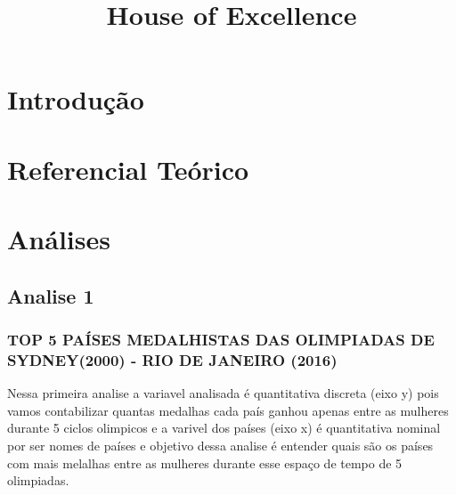 \documentclass[
]{estat/estat}
\title{House of Excellence}
\author{}
\date{}
\renewcommand*\contentsname{Índice}
\newcommand\contentsname{Índice}
\begin{document}
\maketitle

\fancyhf{} 

\fancyhead[L]{} %
\renewcommand{\headrulewidth}{0pt}   %

\fancyfoot[R]{\textcolor{white}{\thepage}} %

\pagestyle{fancy} 

\renewcommand*\contentsname{Sumário}
{
\hypersetup{linkcolor=}
\setcounter{tocdepth}{3}
\tableofcontents
}

\section{Introdução}\label{introduuxe7uxe3o}

\section{Referencial Teórico}\label{referencial-teuxf3rico}

\section{Análises}\label{anuxe1lises}

\subsection{Analise 1}\label{analise-1}

\subsubsection{TOP 5 PAÍSES MEDALHISTAS DAS OLIMPIADAS DE SYDNEY(2000) -
RIO DE JANEIRO
(2016)}\label{top-5-pauxedses-medalhistas-das-olimpiadas-de-sydney2000---rio-de-janeiro-2016}

Nessa primeira analise a variavel analisada é quantitativa discreta
(eixo y) pois vamos contabilizar quantas medalhas cada país ganhou
apenas entre as mulheres durante 5 ciclos olimpicos e a varivel dos
países (eixo x) é quantitativa nominal por ser nomes de países e
objetivo dessa analise é entender quais são os países com mais melalhas
entre as mulheres durante esse espaço de tempo de 5 olimpiadas.
\end{document}
